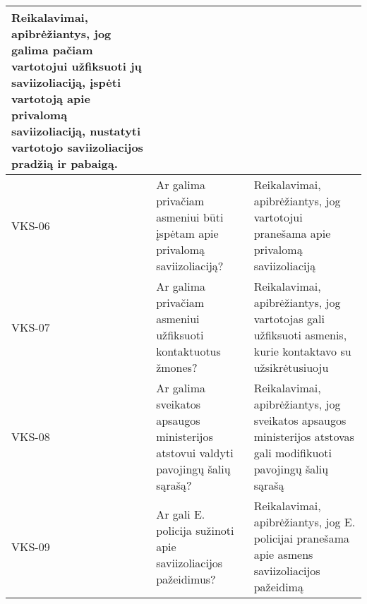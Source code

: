 \documentclass{VUMIFPSkursinis}
\begin{document}
\begin{center}
\begin{longtable}{|C{2cm}|L{5cm}|L{8cm}|}
		Reikalavimai, apibrėžiantys, jog galima pačiam vartotojui užfiksuoti jų saviizoliaciją, įspėti vartotoją apie privalomą saviizoliaciją, nustatyti vartotojo saviizoliacijos pradžią ir pabaigą. \\ \hline
		VKS-06                                                                                        &
		Ar galima privačiam asmeniui būti įspėtam apie privalomą saviizoliaciją?                      &
		Reikalavimai, apibrėžiantys, jog vartotojui pranešama apie privalomą saviizoliaciją                                                                                                             \\ \hline
		VKS-07                                                                                        &
		Ar galima privačiam asmeniui užfiksuoti kontaktuotus žmones?                                  &
		Reikalavimai, apibrėžiantys, jog vartotojas gali užfiksuoti asmenis, kurie kontaktavo su užsikrėtusiuoju                                                                                        \\ \hline
		VKS-08                                                                                        &
		Ar galima sveikatos apsaugos ministerijos atstovui valdyti pavojingų šalių sąrašą?            &
		Reikalavimai, apibrėžiantys, jog sveikatos apsaugos ministerijos atstovas gali modifikuoti pavojingų šalių sąrašą                                                                               \\ \hline
		VKS-09                                                                                        &
		Ar gali E. policija sužinoti apie saviizoliacijos pažeidimus?                                 &
		Reikalavimai, apibrėžiantys, jog E. policijai pranešama apie asmens saviizoliacijos pažeidimą                                                                                                   \\ \hline
	\end{longtable}
\end{center}
\end{document}
